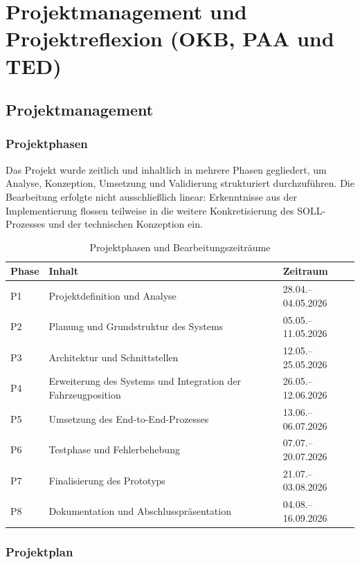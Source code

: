 \section{Projektmanagement und Projektreflexion (OKB, PAA und TED)}

\subsection{Projektmanagement}

\subsubsection{Projektphasen}

Das Projekt wurde zeitlich und inhaltlich in mehrere Phasen
gegliedert, um Analyse, Konzeption, Umsetzung und Validierung
strukturiert durchzuführen. Die Bearbeitung erfolgte nicht
ausschließlich linear: Erkenntnisse aus der Implementierung
flossen teilweise in die weitere Konkretisierung des
SOLL-Prozesses und der technischen Konzeption ein.

\begin{table}[H]
\centering
\caption{Projektphasen und Bearbeitungszeiträume}
\label{tab:projektphasen}
\begin{tabularx}{\textwidth}{@{}p{}X p{}@{}}
\toprule
Phase & Inhalt & Zeitraum \\
\midrule
P1 & Projektdefinition und Analyse &
28.04.--04.05.2026 \\
P2 & Planung und Grundstruktur des Systems &
05.05.--11.05.2026 \\
P3 & Architektur und Schnittstellen &
12.05.--25.05.2026 \\
P4 & Erweiterung des Systems und Integration der Fahrzeugposition &
26.05.--12.06.2026 \\
P5 & Umsetzung des End-to-End-Prozesses &
13.06.--06.07.2026 \\
P6 & Testphase und Fehlerbehebung &
07.07.--20.07.2026 \\
P7 & Finalisierung des Prototyps &
21.07.--03.08.2026 \\
P8 & Dokumentation und Abschlusspräsentation &
04.08.--16.09.2026 \\
\bottomrule
\end{tabularx}
\end{table}

\subsubsection{Projektplan}


